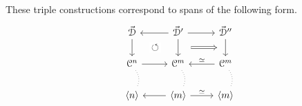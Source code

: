 \documentclass[main.tex]{subfiles}
\begin{document}
These triple constructions correspond to spans of the following form.
\begin{equation*}
  \begin{tikzcd}
    \vec{\category{D}}
    \arrow[d, ""{name=L, right}]
    & \vec{\category{D}}'
    \arrow[d, ""{name=ML, left}, ""{name=MR, right}]
    \arrow[r]
    \arrow[l]
    & \vec{\category{D}}''
    \arrow[d, ""{name=R, right}]
    \\
    \category{C}^{n}
    \arrow[d, no head, dotted, bend left]
    \arrow[r]
    & \category{C}^{m}
    \arrow[d, no head, dotted, bend left]
    & \category{C}^{m}
    \arrow[l, swap, "\simeq"]
    \arrow[d, no head, dotted, bend left]
    \\
    \langle n \rangle
    & \langle m \rangle
    \arrow[l]
    \arrow[r, "\simeq"]
    & \langle m \rangle
    \arrow[from=ML, to=L, phantom, shorten=1.5ex, "\circlearrowleft"{description}]
    \arrow[from=MR, to=R, Rightarrow, shorten=2ex]
  \end{tikzcd}
\end{equation*}
\end{document}
